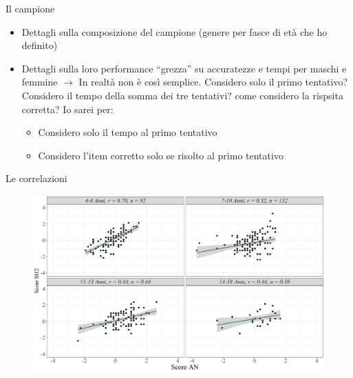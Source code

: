 \documentclass{beamer}
\begin{document}
	\begin{frame}{Il campione}
		
		\begin{itemize}
			\item Dettagli sulla composizione del campione (genere per fasce di età che ho definito)
			
			\item Dettagli sulla loro performance ``grezza'' su accuratezze e tempi per maschi e femmine $\rightarrow$ In realtà non è così semplice. Considero solo il primo tentativo? Considero il tempo della somma dei tre tentativi? come considero la rispsita corretta? Io sarei per: 
			
			\begin{itemize}
				\item Considero solo il tempo al primo tentativo
				\item Considero l'item corretto solo se risolto al primo tentativo
			\end{itemize}
			
		\end{itemize}
		
			\end{frame}


\begin{frame}{Le correlazioni}
	
	\begin{figure}
		\centering
		\includegraphics[width=\linewidth]{img/correlazioni_gruppi.pdf}
	\end{figure}
	
\end{frame}
\end{document}
